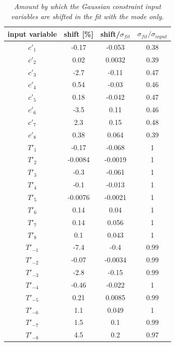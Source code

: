 \begin{table}[!h]
	\begin{center}
		\begin{tabular}{c| c| c|c}
			input variable & \quad shift [\%] \quad & shift/$\sigma_{fit}$ & \quad $\sigma_{fit}/ \sigma_{input}$\\
			\hline
			\hline	
$c'_1$ & -0.17 & -0.053 & 0.38\\ 
$c'_2$ & 0.02 & 0.0032 & 0.39\\ 
$c'_3$ & -2.7 & -0.11 & 0.47\\ 
$c'_4$ & 0.54 & -0.03 & 0.46\\ 
$c'_5$ & 0.18 & -0.042 & 0.47\\ 
$c'_6$ & -3.5 & 0.11 & 0.46\\ 
$c'_7$ & 2.3 & 0.15 & 0.48\\ 
$c'_8$ & 0.38 & 0.064 & 0.39\\ 
$T'_1$ & -0.17 & -0.068 & 1\\ 
$T'_2$ & -0.0084 & -0.0019 & 1\\ 
$T'_3$ & -0.3 & -0.061 & 1\\ 
$T'_4$ & -0.1 & -0.013 & 1\\ 
$T'_5$ & -0.0076 & -0.0021 & 1\\ 
$T'_6$ & 0.14 & 0.04 & 1\\ 
$T'_7$ & 0.14 & 0.056 & 1\\ 
$T'_8$ & 0.1 & 0.043 & 1\\ 
$T'_{-1}$ & -7.4 & -0.4 & 0.99\\ 
$T'_{-2}$ & -0.07 & -0.0034 & 0.99\\ 
$T'_{-3}$ & -2.8 & -0.15 & 0.99\\ 
$T'_{-4}$ & -0.46 & -0.022 & 1\\ 
$T'_{-5}$ & 0.21 & 0.0085 & 0.99\\ 
$T'_{-6}$ & 1.1 & 0.049 & 1\\ 
$T'_{-7}$ & 1.5 & 0.1 & 0.99\\ 
$T'_{-8}$ & 4.5 & 0.2 & 0.97\\ 
\end{tabular}
\end{center}
\caption{\textit{Amount by which the Gaussian constraint input variables are shifted in the fit with the \KlPiPi mode only.}}
\end{table} 

